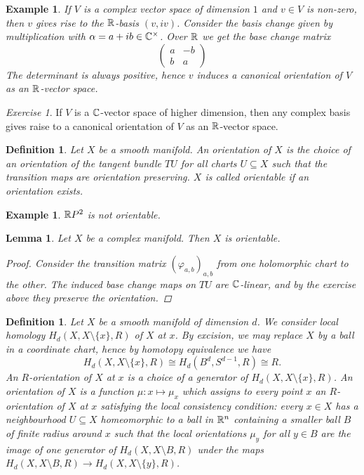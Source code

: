 \documentclass[A4paper, british, reqno]{amsart}
\theoremstyle{darkgreentheorem}
\newtheorem{lm}[thm]{Lemma}
\theoremstyle{darkbluedefinition}
\newtheorem{defn}[thm]{Definition}
\theoremstyle{darkredexample}
\newtheorem{exa}[thm]{Example}
\theoremstyle{remark}
\newtheorem{exe}[thm]{Exercise}
\newcommand{\1}{\mathbbm{1}}
\newcommand{\tms}{\times}
\newcommand{\sub}{\subseteq}
\begin{document}
\begin{exa}
    If $V$ is a complex vector space of dimension $1$ and $v\in V$ is non-zero, then $v$ gives rise to the $\mathbb{R}$-basis $(v,iv)$.
    Consider the basis change given by multiplication with $\alpha=a+ib\in \C^{\tms}$.
    Over $\mathbb{R}$ we get the base change matrix
    \[ \begin{pmatrix} a & -b \\ b & a\end{pmatrix} \]
    The determinant is always positive, hence $v$ induces a canonical orientation of $V$ as an $\mathbb{R}$-vector space.
\end{exa}

\begin{exe}
    If $V$ is a $\mathbb{C}$-vector space of higher dimension, then any complex basis gives raise to a canonical orientation of $V$ as an $\mathbb{R}$-vector space.
\end{exe}

\begin{defn}
    Let $X$ be a smooth manifold.
    An \textit{orientation} of $X$ is the choice of an orientation of the tangent bundle $TU$ for all charts $U\sub X$ such that the transition maps are orientation preserving.
    $X$ is called orientable if an orientation exists.
\end{defn}

\begin{exa}
    $\mathbb{R} P^{2}$ is not orientable.
\end{exa}

\begin{lm}
    Let $X$ be a complex manifold.
    Then $X$ is orientable.
    \begin{proof}
	Consider the transition matrix $(\varphi_{a,b})_{a,b}$ from one holomorphic chart to the other.
	The induced base change maps on $TU$ are $\mathbb{C}$-linear, and by the exercise above they preserve the orientation.
    \end{proof}
\end{lm}

\begin{defn}
    Let $X$ be a smooth manifold of dimension $d$.
    We consider \textit{local homology} $H_{d}(X,X\setminus \{x\},R)$ of $X$ at $x$.
    By excision, we may replace $X$ by a ball in a coordinate chart, hence by homotopy equivalence we have
    \[ H_{d}(X,X\setminus\{ x\},R)\cong H_{d}(B^{d},S^{d-1},R)\cong R. \]
    An $R$-orientation of $X$ at $x$ is a choice of a generator of $H_{d}(X,X\setminus \{ x\},R)$.
    An \textit{orientation} of $X$ is a function $\mu\colon x\mapsto \mu_{x}$ which assigns to every point $x$ an $R$-orientation of $X$ at $x$ satisfying the local consistency condition: every $x\in X$ has a neighbourhood $U\sub X$ homeomorphic to a ball in $\mathbb{R}^{n}$ containing a smaller ball $B$ of finite radius around $x$ such that the local orientations $\mu_{y}$ for all $y\in B$ are the image of one generator of $H_{d}(X,X\setminus B,R)$ under the maps $H_{d}(X,X\setminus B,R)\to H_{d}(X,X\setminus \{y\},R)$.
\end{defn}
\end{document}
